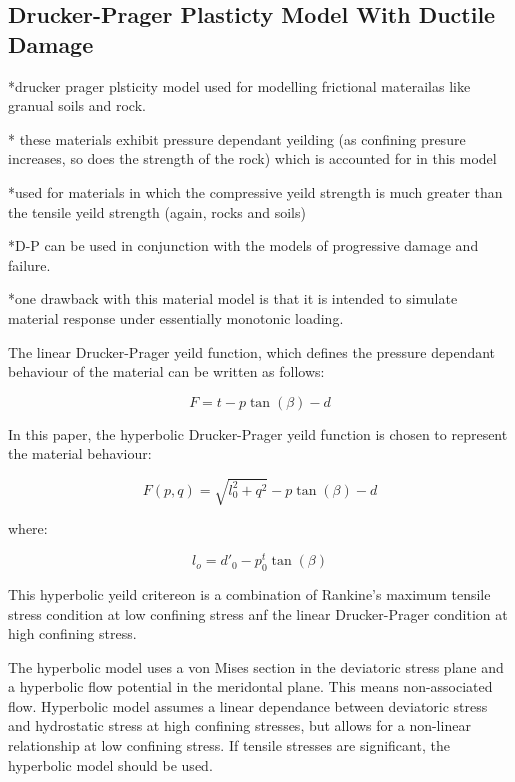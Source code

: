 \subsection{Drucker-Prager Plasticty Model With Ductile Damage}

{*}drucker prager plsticity model used for modelling frictional materailas
like granual soils and rock.

{*} these materials exhibit pressure dependant yeilding (as confining
presure increases, so does the strength of the rock) which is accounted
for in this model

{*}used for materials in which the compressive yeild strength is much
greater than the tensile yeild strength (again, rocks and soils)

{*}D-P can be used in conjunction with the models of progressive damage
and failure.

{*}one drawback with this material model is that it is intended to
simulate material response under essentially monotonic loading. 

The linear Drucker-Prager yeild function, which defines the pressure
dependant behaviour of the material can be written as follows:

\begin{equation}
F=t-p\tan\left(\beta\right)-d\label{eqn:druc1}
\end{equation}


In this paper, the hyperbolic Drucker-Prager yeild function is chosen
to represent the material behaviour:

\begin{equation}
F\left(p,q\right)=\sqrt{l_{0}^{2}+q^{2}}-p\tan\left(\beta\right)-d\label{eqn:druc2}
\end{equation}


where:

\begin{equation}
l_{o}=d'_{0}-p_{0}^{t}\tan\left(\beta\right)\label{eqn:druc2-1}
\end{equation}

This hyperbolic yeild critereon is a combination of Rankine's maximum tensile stress condition at low confining stress anf the linear Drucker-Prager condition at high
confining stress.

The hyperbolic model uses a von Mises section in the deviatoric stress
plane and a hyperbolic flow potential in the meridontal plane. This
means non-associated flow. Hyperbolic model assumes a linear dependance
between deviatoric stress and hydrostatic stress at high confining
stresses, but allows for a non-linear relationship at low confining
stress. If tensile stresses are significant, the hyperbolic model
should be used.




